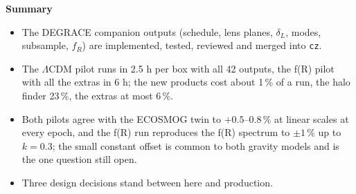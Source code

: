 \documentclass[UTF8]{beamer}
\begin{document}
\begin{frame}{\textbf{Summary}}
  \small
  \begin{itemize}
    \item The DEGRACE companion outputs (schedule, lens planes, $\delta_L$, modes, subsample, $f_R$) are implemented,
      tested, reviewed and merged into \texttt{cz}.
    \item The $\Lambda$CDM pilot runs in 2.5 h per box with all 42 outputs, the f(R) pilot with all the extras
      in 6 h; the new products cost about 1\,\% of a run, the halo finder 23\,\%, the extras at most 6\,\%.
    \item Both pilots agree with the ECOSMOG twin to $+0.5$--$0.8\,\%$ at linear scales at every epoch, and the
      f(R) run reproduces the f(R) spectrum to $\pm1\,\%$ up to $k = 0.3$; the small constant offset is common
      to both gravity models and is the one question still open.
    \item Three design decisions stand between here and production.
  \end{itemize}
\end{frame}
\end{document}
